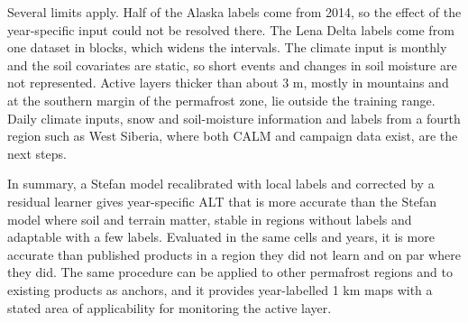 Several limits apply. Half of the Alaska labels come from 2014, so the effect of the year-specific input could not be resolved there. The Lena Delta labels come from one dataset in \nnblkLe{} blocks, which widens the intervals. The climate input is monthly and the soil covariates are static, so short events and changes in soil moisture are not represented. Active layers thicker than about 3 m, mostly in mountains and at the southern margin of the permafrost zone, lie outside the training range. Daily climate inputs, snow and soil-moisture information and labels from a fourth region such as West Siberia, where both CALM and campaign data exist, are the next steps.

In summary, a Stefan model recalibrated with local labels and corrected by a residual learner gives year-specific ALT that is more accurate than the Stefan model where soil and terrain matter, stable in regions without labels and adaptable with a few labels. Evaluated in the same cells and years, it is more accurate than published products in a region they did not learn and on par where they did. The same procedure can be applied to other permafrost regions and to existing products as anchors, and it provides year-labelled 1 km maps with a stated area of applicability for monitoring the active layer.
